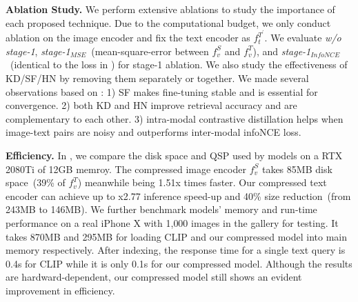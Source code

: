 \textbf{Ablation Study.} We perform extensive ablations to study the importance of each proposed technique. Due to the computational budget, we only conduct ablation on the image encoder and fix the text encoder as $f_t^{T^\prime}$. We evaluate  \textit{w/o stage-1}, \textit{stage-1$_{MSE}$}~(mean-square-error between $f_v^{S}$ and $f_v^{T}$), and \textit{stage-1$_{InfoNCE}$}~(identical to the loss in ) for stage-1 ablation. We also study the effectiveness of KD/SF/HN by removing them separately or together. We made several observations based on : 1) SF makes fine-tuning stable and is essential for convergence. 2) both KD and HN improve retrieval accuracy and are complementary to each other. 3) intra-modal contrastive distillation helps when image-text pairs are noisy and outperforms inter-modal infoNCE loss.


\textbf{Efficiency.} In , we compare the disk space and QSP used by models on a RTX 2080Ti of 12GB memroy. The compressed image encoder $f_v^{S}$ takes 85MB disk space~(39\% of $f_v^{T}$) meanwhile being 1.51x times faster. Our compressed text encoder can achieve up to x2.77 inference speed-up and 40\% size reduction~(from 243MB to 146MB). We further benchmark models'  memory and run-time performance on a real iPhone X with 1,000 images in the gallery for testing. It takes 870MB and 295MB for loading CLIP and our compressed model into main memory respectively. After indexing, the response time for a single text query is 0.4s for CLIP while it is only 0.1s for our compressed model. Although the results are hardward-dependent, our compressed model still shows an evident improvement in efficiency.



